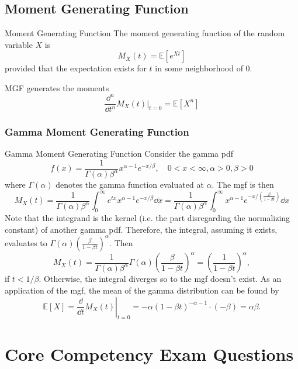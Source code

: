 \documentclass[../main]{subfiles}
\begin{document}
\subsection{Moment Generating Function}
\begin{gbox}{Moment Generating Function}
    The moment generating function of the random variable $X$ is 
    \[
    M_X(t) = \mathbb E \left[e^{Xt}\right]
    \]
    provided that the expectation exists for $t$ in some neighborhood of $0$.
\end{gbox}
\begin{bbox}{MGF generates the moments}
    \[
    \frac{\dd^n}{\dd t^n} M_X(t)|_{t=0} = \mathbb E[X^n]
    \]
\end{bbox}
\subsubsection{Gamma Moment Generating Function}
\begin{pbox}{Gamma Moment Generating Function}
    Consider the gamma pdf 
    \[
    f(x) = \frac{1}{\Gamma(\alpha)\beta^\alpha}x^{\alpha-1}e^{-x/\beta}, \quad 0 < x <\infty, \alpha>0, \beta > 0
    \]
    where $\Gamma(\alpha)$ denotes the gamma function evaluated at $\alpha$. The mgf is then 
    \[
    M_X(t) = \frac{1}{\Gamma(\alpha)\beta^\alpha}\int_{0}^\infty e^{tx}x^{\alpha-1}e^{-x/\beta}\dd x = \frac{1}{\Gamma(\alpha)\beta^\alpha}\int_{0}^\infty x^{\alpha-1}e^{-x/(\frac{\beta}{1-\beta t})}\dd x
    \]
    Note that the integrand is the kernel (i.e. the part disregarding the normalizing constant) of another gamma pdf. Therefore, the integral, assuming it exists, evaluates to $\Gamma(\alpha)(\frac{\beta}{1-\beta t})^\alpha$. Then
    \[
    M_X(t) = \frac{1}{\Gamma(\alpha)\beta^\alpha}\Gamma(\alpha)\left(\frac{\beta}{1-\beta t}\right)^\alpha = \left(\frac{1}{1-\beta t}\right)^\alpha,
    \] if $t < 1/\beta$. Otherwise, the integral diverges so to the mgf doesn't exist. As an application of the mgf, the mean of the gamma distribution can be found by
    \[
    \mathbb E [X] = \left. \frac{\dd}{\dd t}M_X(t)\right|_{t=0} = -\alpha (1-\beta t)^{-\alpha-1} \cdot (-\beta) = \alpha \beta.
    \]
\end{pbox}
\section{Core Competency Exam Questions}
\end{document}
